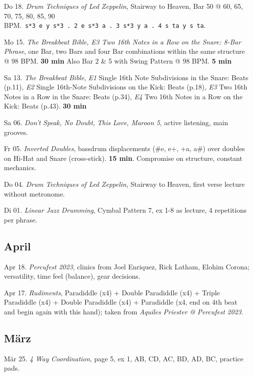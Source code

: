 \documentclass[
]{book}
\begin{document}
Do 18. \emph{Drum Techniques of Led Zeppelin}, Stairway to Heaven, Bar 50 @ 60, 65, 70, 75, 80, 85, 90 BPM.~\texttt{s*3\ e\ y\ s*3\ .\ 2\ e\ s*3\ a\ .\ 3\ s*3\ y\ a\ .\ 4\ s\ ta\ y\ s\ ta}.

Mo 15. \emph{The Breakbeat Bible, E3 Two 16th Notes in a Row on the Snare: 8-Bar Phrase}, one Bar, two Bars and four Bar combinations within the same structure @ 98 BPM. \textbf{30 min} Also Bar 2 \& 5 with Swing Pattern @ 98 BPM. \textbf{5 min}

Sa 13. \emph{The Breakbeat Bible}, \emph{E1} Single 16th Note Subdivisions in the Snare: Beats (p.11), \emph{E2} Single 16th-Note Subdivisions on the Kick: Beats (p.18), \emph{E3} Two 16th Notes in a Row in the Snare: Beats (p.34), \emph{E4} Two 16th Notes in a Row on the Kick: Beats (p.43). \textbf{30 min}

Sa 06. \emph{Don't Speak, No Doubt}, \emph{This Love, Maroon 5}, active listening, main grooves.

Fr 05. \emph{Inverted Doubles}, bassdrum displacements (\#e, e+, +a, a\#) over doubles on Hi-Hat and Snare (cross-stick). \textbf{15 min}. Compromise on structure, constant mechanics.

Do 04. \emph{Drum Techniques of Led Zeppelin}, Stairway to Heaven, first verse lecture without metronome.

Di 01. \emph{Linear Jazz Drumming}, Cymbal Pattern 7, ex 1-8 as lecture, 4 repetitions per phrase.

\hypertarget{april-2023}{%
\subsection*{April}\label{april-2023}}

Apr 18. \emph{Percufest 2023}, clinics from Joel Enriquez, Rick Latham, Elohim Corona; versatility, time feel (balance), gear decisions.

Apr 17. \emph{Rudiments}, Paradiddle (x4) + Double Paradiddle (x4) + Triple Paradiddle (x4) + Double Paradiddle (x4) + Paradiddle (x4, end on 4th beat and begin again with this hand); taken from \emph{Aquiles Priester @ Percufest 2023}.

\hypertarget{maerz-2023}{%
\subsection*{März}\label{maerz-2023}}

Mär 25. \emph{4 Way Coordination}, page 5, ex 1, AB, CD, AC, BD, AD, BC, practice pads.
\end{document}
